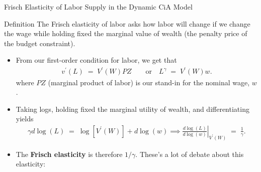 \documentclass[10pt,c,aspectratio=1610,handout]{beamer}
\begin{document}
\begin{frame}{Frisch Elasticity of Labor Supply in the Dynamic CiA Model}%
  \begin{block}{Definition}%
    The Frisch elasticity of labor asks how labor will change if we change the wage while holding fixed the marginal value of wealth {\footnotesize(the penalty price of the budget constraint)}.%
  \end{block}%
  \pause%
  \begin{itemize}%
    \item[$\blacktriangleright$] From our first-order condition for labor, we get that%
    \begin{align*}%
      v^{\prime}(L) \; = \; V^{\prime}(W) P Z \quad \quad \text{or} \quad L^{\gamma} \; = \; V^{\prime}(W) w.%
    \end{align*}%
    where $P Z$ (marginal product of labor) is our stand-in for the nominal wage, $w$.%
    \pause%
    \item[$\blacktriangleright$] Taking logs, holding fixed the marginal utility of wealth, and differentiating yields%
    \begin{align*}%
      \gamma d \log(L) \; = \; \log \left[ V^{\prime}(W)\right] + d\log(w) \implies \left. \frac{d\log(L)}{d\log(w)} \right\vert_{V^{\prime}(W)} \; = \; \frac{1}{\gamma}.%
    \end{align*}%
    \pause%
    \item[$\blacktriangleright$] The \textbf{Frisch elasticity} is therefore $1/\gamma$. These's a lot of debate about this elasticity:%
    \begin{itemize}%
    \end{itemize}%
  \end{itemize}%
\end{frame}%
\end{document}
